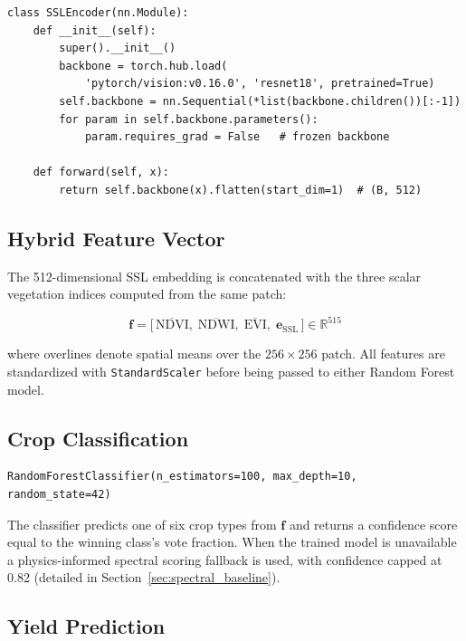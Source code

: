 \documentclass[12pt,a4paper,oneside]{report}
\begin{document}
\begin{lstlisting}[caption={SSL Encoder definition (PyTorch \cite{paszke2019pytorch}).}]
class SSLEncoder(nn.Module):
    def __init__(self):
        super().__init__()
        backbone = torch.hub.load(
            'pytorch/vision:v0.16.0', 'resnet18', pretrained=True)
        self.backbone = nn.Sequential(*list(backbone.children())[:-1])
        for param in self.backbone.parameters():
            param.requires_grad = False   # frozen backbone

    def forward(self, x):
        return self.backbone(x).flatten(start_dim=1)  # (B, 512)
\end{lstlisting}

\subsection{Hybrid Feature Vector}

The 512-dimensional SSL embedding is concatenated with the three scalar vegetation
indices computed from the same patch:

\begin{equation}
\mathbf{f} = \bigl[\,\overline{\mathrm{NDVI}},\;\overline{\mathrm{NDWI}},\;
              \overline{\mathrm{EVI}},\;\mathbf{e}_\mathrm{SSL}\,\bigr]
              \in \mathbb{R}^{515}
\label{eq:feature}
\end{equation}

where overlines denote spatial means over the $256\times256$ patch. All features are
standardized with \texttt{StandardScaler} \cite{pedregosa2011scikit} before being
passed to either Random Forest model.

\subsection{Crop Classification}

\begin{lstlisting}[caption={Random Forest classifier configuration.}]
RandomForestClassifier(n_estimators=100, max_depth=10, random_state=42)
\end{lstlisting}

The classifier predicts one of six crop types from $\mathbf{f}$ and returns a
confidence score equal to the winning class's vote fraction. When the trained model
is unavailable a physics-informed spectral scoring fallback is used, with confidence
capped at 0.82 (detailed in Section~\ref{sec:spectral_baseline}).

\subsection{Yield Prediction}
\end{document}
